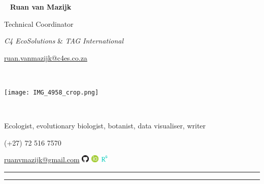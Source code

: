 \begin{multicols}{3}
  \
  \vfill
  \raggedleft
    {\huge \textbf{Ruan van Mazijk}} \par
    {\Large Technical Coordinator} \par
    \textit{C4 EcoSolutions} \& \textit{TAG International} \par
    \href{mailto:ruan.vanmazijk@c4es.co.za}{ruan.vanmazijk@c4es.co.za} \par
  \vfill
  \
  \begin{center}
    \texttt{[image: IMG\_4958\_crop.png]}
  \end{center}
  \columnbreak
  \par \
  \vfill
  \raggedright
    Ecologist, evolutionary biologist, botanist, data visualiser, writer \par
    (+27) 72 516 7570 \par
    \href{mailto:ruanvmazijk@gmail.com}{ruanvmazijk@gmail.com}
      \href{https://github.com/rvanmazijk}
           {\includegraphics[width=1em]{logos/GitHub.png}}
      \href{https://orcid.org/0000-0003-2659-6909}
           {\includegraphics[width=1em]{logos/ORCID.png}}
      \href{https://www.researchgate.net/profile/Ruan-Van-Mazijk}
           {\includegraphics[width=1em]{logos/ResearchGate-white_crop.jpg}}
  \vfill
\end{multicols}

\hrule \vskip2pt \hrule
